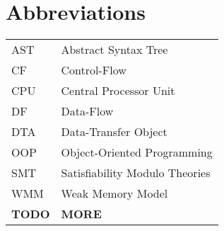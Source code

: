 \chapter*{Abbreviations}


\noindent
\begin{longtable}{@{}p{}p{}@{}}
AST & Abstract Syntax Tree \\
CF  & Control-Flow \\
CPU & Central Processor Unit \\
DF  & Data-Flow \\
DTA & Data-Transfer Object \\
OOP & Object-Oriented Programming \\
SMT & Satisfiability Modulo Theories \\
WMM & Weak Memory Model \\
\textbf{TODO} & \textbf{MORE}
\end{longtable}

